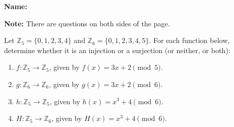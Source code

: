 \documentclass[12pt]{article}
\newcommand{\points}[1]{\marginpar{\hspace{24pt}[#1]}}
\newcommand{\Z}{\mathbb{Z}}
\begin{document}
{\bf Name:}
\thispagestyle{fancy}

\bigskip

{\bf Note:} There are questions on both sides of the page.

Let $\Z_5=\{0,1,2,3,4\}$ and $\Z_6 = \{0,1,2,3,4,5\}$. For each function below, determine whether it is an injection or a surjection (or neither, or both):
\begin{enumerate}
 \item $f:\Z_5\to\Z_5$, given by $f(x)=3x+2 \pmod{5}$. \points{3}

\vspace{3.5in}

 \item $g:\Z_6\to \Z_6$, given by $g(x) = 3x+2 \pmod{6}$. \points{3}

\newpage

 \item $h:\Z_5\to \Z_5$, given by $h(x) = x^3+4 \pmod{6}$. \points{3}

\vspace{4.5in}

 \item $H:\Z_5 \to \Z_6$, given by $H(x) = x^3+4 \pmod{6}$. \points{1}
\end{enumerate}
\end{document}
